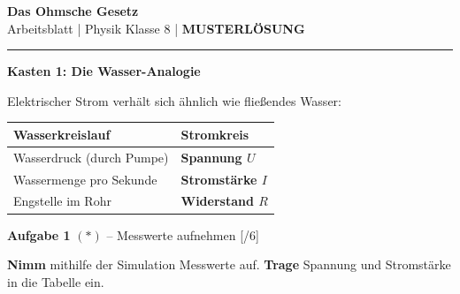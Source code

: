\documentclass[11pt, a4paper]{article}
\newcommand{\fach}{Physik}
\newcommand{\thema}{Das Ohmsche Gesetz}
\newcommand{\klasse}{8}
\newcommand{\loes}[1]{\textcolor{loesung}{\textbf{#1}}}
\newcommand{\punktebox}[1]{\hfill\small\textcolor{mittelgrau}{[\hspace{0.8em}/#1]}}
\newcommand{\aufgabe}[2]{%
    \needspace{4\baselineskip}%
    \vspace{8pt}%
    \noindent\textbf{\textcolor{fachfarbe}{Aufgabe #1}} #2%
    \vspace{4pt}%
    \nopagebreak[4]%
}
\newcommand{\operator}[1]{\textbf{#1}}
\begin{document}

\begin{center}
    {\Large\bfseries\textcolor{fachfarbe}{\thema}}\\[0.2em]
    {\small Arbeitsblatt | \fach{} Klasse \klasse{} | \textcolor{loesung}{\textbf{MUSTERLÖSUNG}}}
\end{center}
\vspace{-0.5em}
\hrule
\vspace{0.8em}


\begin{merkkasten}
\textbf{Kasten 1: Die Wasser-Analogie}

\vspace{0.3em}
Elektrischer Strom verhält sich ähnlich wie fließendes Wasser:

\vspace{0.5em}
\begin{center}
\begin{tabular}{|>{\raggedright\arraybackslash}p{4.5cm}|p{5cm}|}
\hline
\textbf{Wasserkreislauf} & \textbf{Stromkreis} \\
\hline
Wasserdruck (durch Pumpe) & \loes{Spannung $U$} \\[0.6em]
\hline
Wassermenge pro Sekunde & \loes{Stromstärke $I$} \\[0.6em]
\hline
Engstelle im Rohr & \loes{Widerstand $R$} \\[0.6em]
\hline
\end{tabular}
\end{center}
\end{merkkasten}


\aufgabe{1}{$(*)$ – Messwerte aufnehmen} \punktebox{6}

\operator{Nimm} mithilfe der Simulation Messwerte auf. \operator{Trage} Spannung und Stromstärke in die Tabelle ein.
\end{document}
